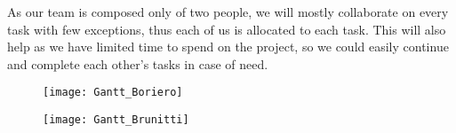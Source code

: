 
As our team is composed only of two people, we will mostly collaborate on every task with few exceptions, thus each of us is allocated to each task. This will also help as we have limited time to spend on the project, so we could easily continue and complete each other's tasks in case of need.\\
\begin{figure}
\hspace*{-4cm}\texttt{[image: Gantt\_Boriero]}
\end{figure}

\begin{figure}
\hspace*{-4cm}\texttt{[image: Gantt\_Brunitti]}
\end{figure}
